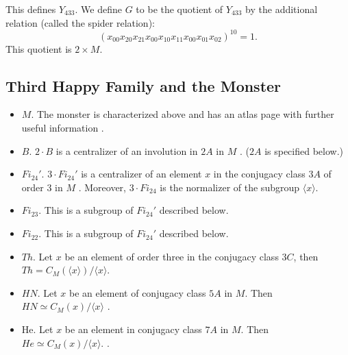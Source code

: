 This defines $Y_{433}$.  We define $G$ to be the quotient of $Y_{433}$ by
the additional relation (called the spider relation):
\[
(x_{00}x_{20}x_{21} x_{00}x_{10}x_{11} x_{00} x_{01} x_{02})^{10} = 1.
\]
This quotient is $2 \times M$.



\subsection{Third Happy Family and the Monster} \label{third-happy-family}

 
\begin{itemize}
\item $M$.  The monster is characterized above and has an atlas page
  with further useful information \cite{AM}.
\item $B$.  $2\cdot B$ is a centralizer of an involution in $2A$ in $M$
  \cite[p.256]{wilson2009finite}.  ($2A$ is specified below.)
\item $Fi_{24}'$.  $3\cdot Fi_{24}'$ is a centralizer of an element $x$ in
  the conjugacy class $3A$ of order $3$ in $M$ \cite[p.256-257]{wilson2009finite}.
  Moreover, $3\cdot Fi_{24}$ is the normalizer of the subgroup $\langle x\rangle $.
\item $Fi_{23}$.  This is a subgroup of $Fi_{24}'$ described below.
\item $Fi_{22}$.  This is a subgroup of $Fi_{24}'$ described below.
\item $Th$.  Let $x$ be an element of order three in the conjugacy
  class $3C$, then $Th = C_M(\langle x\rangle )/\langle x\rangle $.
\item $HN$.  Let $x$ be an element of conjugacy class $5A$ in $M$.
  Then $HN \simeq C_M(x)/\langle x\rangle $ \cite[p.262]{wilson2009finite}.
\item He.  Let $x$ be an element in conjugacy class $7A$ in $M$.  Then
  $He \simeq C_M(x)/\langle x\rangle.$ \cite[p.263]{wilson2009finite}.  %
\end{itemize}

